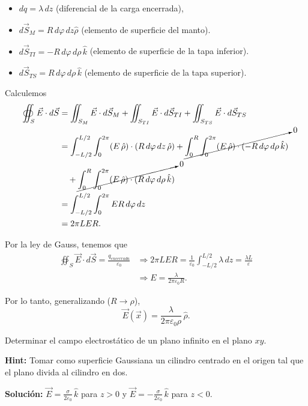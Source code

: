 \begin{ejemplo}
\begin{itemize}
\item $dq = \lambda \,dz $ (diferencial de la carga encerrada),

\item $d\vec{S}_M = R \, d\varphi \,dz \hat{\rho} $ (elemento de superficie del manto).

\item $d\vec{S}_{TI} = - R \,d\varphi\, d\rho \,\hat{k}$ (elemento de superficie de la tapa inferior). 

\item $d\vec{S}_{TS} = R \,d\varphi\, d\rho \,\hat{k}$ (elemento de superficie de la tapa superior).
\end{itemize}

Calculemos
\begingroup
\allowdisplaybreaks
\begin{align*}
    \oiint_S \vec{E} \cdot d\vec{S} &= \iint_{S_{M}} \vec{E} \cdot d\vec{S}_M + \iint_{S_{TI}} \vec{E} \cdot d\vec{S}_{TI} + \iint_{S_{TS}} \vec{E} \cdot d\vec{S}_{TS} \\
    &= \int_{-L/2}^{L/2} \int_0^{2\pi} (E\,\hat{\rho}) \cdot (R\,d\varphi\, dz \,\hat{\rho}) + \cancelto{0}{\int_0^R \int_0^{2\pi} (E\,\hat{\rho})\cdot (- R \,d\varphi \,d\rho \,\hat{k} )} \\
    & \quad + \cancelto{0}{\int_0^R \int_0^{2\pi} (E\,\hat{\rho})\cdot (R \,d\varphi\, d\rho\, \hat{k})} \\
    &= \int_{-L/2}^{L/2} \int_0^{2\pi} E R \,d\varphi \,dz \\
    &= 2\pi L ER.
\end{align*}
\endgroup

Por la ley de Gauss, tenemos que
\begin{align*}
    \oiint_S \vec{E} \cdot d\vec{S} = \frac{q_{encerrada}}{\varepsilon_0} &\Rightarrow 2\pi L E R = \frac{1}{\varepsilon_0} \int_{-L/2}^{L/2} \lambda \,dz = \frac{\lambda L}{\varepsilon} \\
    &\Rightarrow E = \frac{\lambda}{2\pi \varepsilon_0 R}.
\end{align*}

Por lo tanto, generalizando ($R \to \rho$),
$$\Vec{E}(\Vec{x}) = \frac{\lambda}{2\pi \varepsilon_0 \rho} \,\hat{\rho}.$$

\end{ejemplo}

\begin{ejemplo}[Propuesto]
Determinar el campo electrostático  de un plano infinito en el plano $xy$. 

\textbf{Hint:} Tomar como superficie Gaussiana un cilindro centrado en el origen tal que el plano divida al cilindro en dos. 

\textbf{Solución:}  $\vec{E} = \frac{\sigma}{2\varepsilon_0} \,\hat{k}$ para $z > 0$ y $\vec{E} = - \frac{\sigma}{2 \varepsilon_0} \,\hat{k}$ para $z <0$.

\end{ejemplo}


